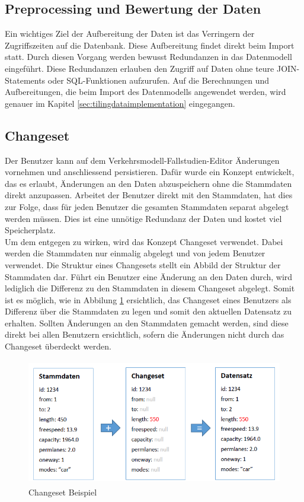 \subsection{Preprocessing und Bewertung der Daten}\label{sec:concept_preprocessing}
Ein wichtiges Ziel der Aufbereitung der Daten ist das Verringern der Zugriffszeiten auf die Datenbank. Diese Aufbereitung findet direkt beim Import statt. Durch diesen Vorgang werden bewusst Redundanzen in das Datenmodell eingeführt. Diese Redundanzen erlauben den Zugriff auf Daten ohne teure JOIN-Statements oder SQL-Funktionen aufzurufen. Auf die Berechnungen und Aufbereitungen, die beim Import des Datenmodells angewendet werden, wird genauer im Kapitel \ref{sec:tilingdataimplementation}  eingegangen.
\newpage
\subsection{Changeset}\label{sec:changeset}
Der Benutzer kann auf dem Verkehrsmodell-Fallstudien-Editor Änderungen vornehmen und anschliessend persistieren. Dafür wurde ein Konzept entwickelt, das es erlaubt, Änderungen an den Daten abzuspeichern ohne die Stammdaten direkt anzupassen. Arbeitet der Benutzer direkt mit den Stammdaten, hat dies zur Folge, dass für jeden Benutzer die gesamten Stammdaten separat abgelegt werden müssen. Dies ist eine unnötige Redundanz der Daten und kostet viel Speicherplatz.\\
Um dem entgegen zu wirken, wird das Konzept Changeset verwendet. Dabei werden die Stammdaten nur einmalig abgelegt und von jedem Benutzer verwendet. Die Struktur eines Changesets stellt ein Abbild der Struktur der Stammdaten dar. Führt ein Benutzer eine Änderung an den Daten durch, wird lediglich die Differenz zu den Stammdaten in diesem Changeset abgelegt. Somit ist es möglich, wie in Abbilung \ref{fig:changeset_example} ersichtlich, das Changeset eines Benutzers als Differenz über die Stammdaten zu legen und somit den aktuellen Datensatz zu erhalten. Sollten Änderungen an den Stammdaten gemacht werden, sind diese direkt bei allen Benutzern ersichtlich, sofern die Änderungen nicht durch das Changeset überdeckt werden.
\begin{figure}[H]
\centering
\includegraphics[height=5.5cm]{images/changeset.PNG}
\caption{Changeset Beispiel}
\label{fig:changeset_example}
\end{figure}
\noindent
